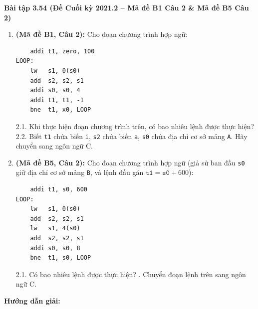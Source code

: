\textbf{Bài tập 3.54 (Đề Cuối kỳ 2021.2 -- Mã đề B1 Câu 2 \& Mã đề B5 Câu 2)}
\begin{enumerate}[label=\alph*)]
    \item \textbf{(Mã đề B1, Câu 2):} Cho đoạn chương trình hợp ngữ:

\noindent\begin{minipage}{\linewidth}
\begin{lstlisting}
    addi t1, zero, 100
LOOP:
    lw   s1, 0(s0)
    add  s2, s2, s1
    addi s0, s0, 4
    addi t1, t1, -1
    bne  t1, x0, LOOP
\end{lstlisting}
\end{minipage}

    2.1. Khi thực hiện đoạn chương trình trên, có bao nhiêu lệnh được thực hiện?\\
    2.2. Biết \texttt{t1} chứa biến \texttt{i}, \texttt{s2} chứa biến \texttt{a}, \texttt{s0} chứa địa chỉ cơ sở mảng \texttt{A}. Hãy chuyển sang ngôn ngữ C.
    \item \textbf{(Mã đề B5, Câu 2):} Cho đoạn chương trình hợp ngữ (giả sử ban đầu \texttt{s0} giữ địa chỉ cơ sở mảng \texttt{B}, và lệnh đầu gán $\texttt{t1} = \texttt{s0} + 600$):

\noindent\begin{minipage}{\linewidth}
\begin{lstlisting}
    addi t1, s0, 600
LOOP:
    lw   s1, 0(s0)
    add  s2, s2, s1
    lw   s1, 4(s0)
    add  s2, s2, s1
    addi s0, s0, 8
    bne  t1, s0, LOOP
\end{lstlisting}
\end{minipage}

    2.1. Có bao nhiêu lệnh được thực hiện? . Chuyển đoạn lệnh trên sang ngôn ngữ C.
\end{enumerate}
\textbf{Hướng dẫn giải:}
